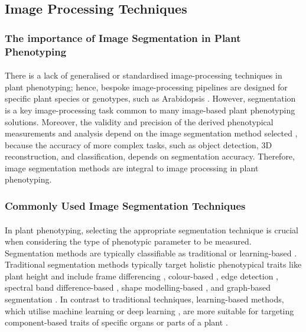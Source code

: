 \subsection{Image Processing Techniques}

\subsubsection{The importance of Image Segmentation in Plant Phenotyping}
\paragraph{}
There is a lack of generalised or standardised image-processing techniques in plant phenotyping; hence, bespoke image-processing pipelines are designed for specific plant species or genotypes, such as Arabidopsis \cite{liReviewImagingTechniques2014, arvidssonGrowthPhenotypingPipeline2011a}. However, segmentation is a key image-processing task common to many image-based plant phenotyping solutions. Moreover, the validity and precision of the derived phenotypical measurements and analysis depend on the image segmentation method selected \cite{choudhurySegmentationTechniquesChallenges2020, muller-linowPlantScreenMobile2019}, because the accuracy of more complex tasks, such as object detection, 3D reconstruction, and classification, depends on segmentation accuracy. Therefore, image segmentation methods are integral to image processing in plant phenotyping.

\subsubsection{Commonly Used Image Segmentation Techniques}
\paragraph{}
In plant phenotyping, selecting the appropriate segmentation technique is crucial when considering the type of phenotypic parameter to be measured. Segmentation methods are typically classifiable as traditional or learning-based \cite{choudhurySegmentationTechniquesChallenges2020}. Traditional segmentation methods typically target holistic phenotypical traits like plant height and include frame differencing \cite{daschoudhuryHolisticComponentPlant2018}, colour-based \cite{hamudaSurveyImageProcessing2016a}, edge detection \cite{wangImageSegmentationOverlapping2018}, spectral band difference-based \cite{gampaDatadrivenApproachDetecting2019}, shape modelling-based \cite{chenLeafSegmentationFunctional2019}, and graph-based segmentation \cite{praveenkumarImageBasedLeaf2019}. In contrast to traditional techniques, learning-based methods, which utilise machine learning or deep learning \cite{papeUtilizingMachineLearning2015, abdallaFinetuningConvolutionalNeural2019}, are more suitable for targeting component-based traits of specific organs or parts of a plant \cite{choudhurySegmentationTechniquesChallenges2020}.